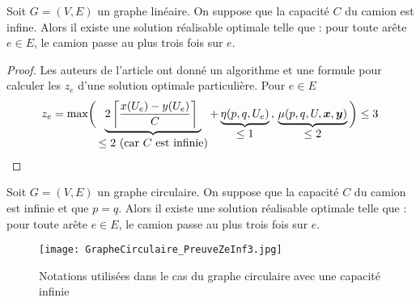 \begin{prop}\label{Ze inf 3 - lineaire}
Soit $G=(V,E)$ un graphe linéaire. On suppose que la capacité $C$ du camion est infine. Alors il existe une solution réalisable optimale telle que : pour toute arête $e \in E$, le camion passe au plus trois fois sur $e$.
\end{prop}

\begin{proof}
Les auteurs de l'article \cite{Benchimol2011} ont donné un algorithme et une formule pour calculer les $z_e$ d'une solution optimale particulière. Pour $e \in E$
\begin{gather*}
  z_e = \mbox{max}
  \bigg(
    \underbrace{ 2 \left\lceil \frac{x(U_e)-y(U_e)}{C} \right\rceil\ }_{\displaystyle \le 2 \mbox{ (car } C\mbox{ est infinie)} } +
    \underbrace{ \eta(p,q,U_e) }_{\displaystyle \le 1}\,,\,
    \underbrace{ \mu(p,q,U,\bs{x},\bs{y}) }_{\displaystyle \le 2}
  \bigg)
  \le 3
\end{gather*}
\end{proof}

\begin{lem}\label{Ze inf 3 - circulaire}
Soit $G=(V,E)$ un graphe circulaire. On suppose que la capacité $C$ du camion est infinie et que $p=q$. Alors il existe une solution réalisable optimale telle que : pour toute arête $e \in E$, le camion passe au plus trois fois sur $e$.
\end{lem}

\begin{figure}[ht]
  \centering
  \texttt{[image: GrapheCirculaire\_PreuveZeInf3.jpg]}
  \caption{Notations utilisées dans le cas du graphe circulaire avec une capacité infinie}
  \label{Notation graphe circulaire preuve Ze inf 3}
\end{figure}

